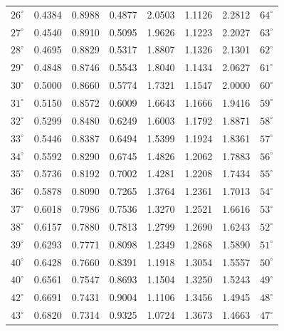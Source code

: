 \documentclass[14pt,a4paper]{extarticle}
\begin{document}
\begin{center}
{{{\begin{tabular}{|>{}c|S[table-format = 2.5]|S[table-format = 2.5]|S[table-format = 2.5]|S[table-format = 3.5]|S[table-format = 2.5]|S[table-format = 3.5]|>{}c|}
$26^{\circ}$ & 0.4384 & 0.8988 & 0.4877 &  2.0503 & 1.1126 &  2.2812 & $64^{\circ}$\\
$27^{\circ}$ & 0.4540 & 0.8910 & 0.5095 &	 1.9626 & 1.1223 &  2.2027 & $63^{\circ}$\\
$28^{\circ}$ & 0.4695 & 0.8829 & 0.5317 &  1.8807 & 1.1326 &  2.1301 & $62^{\circ}$\\
$29^{\circ}$ & 0.4848 & 0.8746 & 0.5543 &  1.8040 & 1.1434 &  2.0627 & $61^{\circ}$\\
$30^{\circ}$ & 0.5000 & 0.8660 & 0.5774 &  1.7321 & 1.1547 &  2.0000 & $60^{\circ}$\\
$31^{\circ}$ & 0.5150 & 0.8572 & 0.6009 &  1.6643 & 1.1666 &  1.9416 & $59^{\circ}$\\
$32^{\circ}$ & 0.5299 & 0.8480 & 0.6249 &  1.6003 & 1.1792 &  1.8871 & $58^{\circ}$\\
$33^{\circ}$ & 0.5446 & 0.8387 & 0.6494 &  1.5399 & 1.1924 &  1.8361 & $57^{\circ}$\\
$34^{\circ}$ & 0.5592 & 0.8290 & 0.6745 &  1.4826 & 1.2062 &  1.7883 & $56^{\circ}$\\
$35^{\circ}$ & 0.5736 & 0.8192 & 0.7002 &  1.4281 & 1.2208 &  1.7434 & $55^{\circ}$\\
$36^{\circ}$ & 0.5878 & 0.8090 & 0.7265 &  1.3764 & 1.2361 &  1.7013 & $54^{\circ}$\\
$37^{\circ}$ & 0.6018 & 0.7986 & 0.7536 &  1.3270 & 1.2521 &  1.6616 & $53^{\circ}$\\
$38^{\circ}$ & 0.6157 & 0.7880 & 0.7813 &  1.2799 & 1.2690 &  1.6243 & $52^{\circ}$\\
$39^{\circ}$ & 0.6293 & 0.7771 & 0.8098 &  1.2349 & 1.2868 &  1.5890 & $51^{\circ}$\\
$40^{\circ}$ & 0.6428 & 0.7660 & 0.8391 &  1.1918 & 1.3054 &  1.5557 & $50^{\circ}$\\
$40^{\circ}$ & 0.6561 & 0.7547 & 0.8693 &  1.1504 & 1.3250 &  1.5243 & $49^{\circ}$\\
$42^{\circ}$ & 0.6691 & 0.7431 & 0.9004 &  1.1106 & 1.3456 &  1.4945 & $48^{\circ}$\\
$43^{\circ}$ & 0.6820 & 0.7314 & 0.9325 &  1.0724 & 1.3673 &  1.4663 & $47^{\circ}$\\

\end{tabular}}}}
\end{center}
\end{document}
